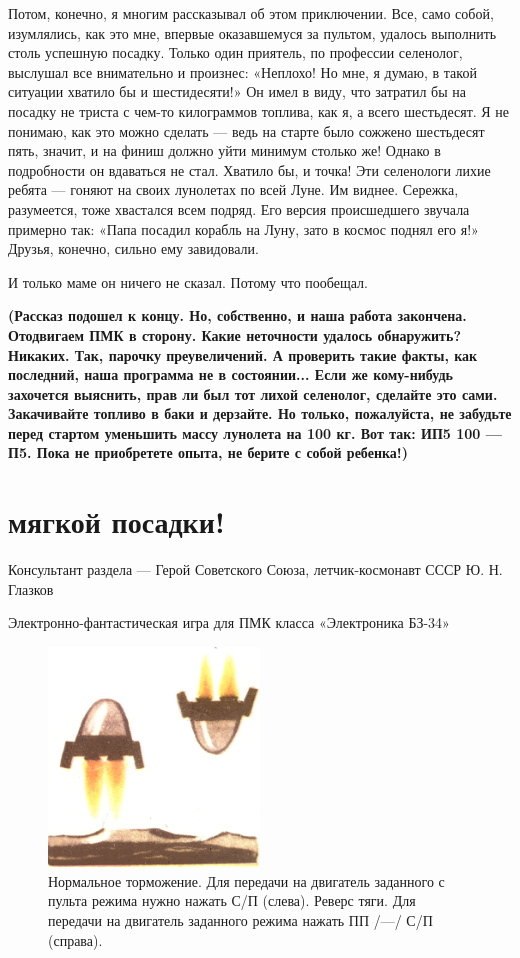 \documentclass[11pt,a4paper,oneside]{article}
\begin{document}
Потом, конечно, я многим рассказывал об этом приключении. Все, само собой, изумлялись, как это мне, впервые оказавшемуся за пультом, удалось выполнить столь успешную посадку. Только один приятель, по профессии селенолог, выслушал все внимательно и произнес: «Неплохо! Но мне, я думаю, в такой ситуации хватило бы и шестидесяти!» Он имел в виду, что затратил бы на посадку не триста с чем-то килограммов топлива, как я, а всего шестьдесят. Я не понимаю, как это можно сделать — ведь на старте было сожжено шестьдесят пять, значит, и на финиш должно уйти минимум столько же! Однако в подробности он вдаваться не стал. Хватило бы, и точка! Эти селенологи лихие ребята — гоняют на своих лунолетах по всей Луне. Им виднее.
Сережка, разумеется, тоже хвастался всем подряд. Его версия происшедшего звучала примерно так: «Папа посадил корабль на Луну, зато в космос поднял его я!» Друзья, конечно, сильно ему завидовали.

И только маме он ничего не сказал. Потому что пообещал.

\textbf{
(Рассказ подошел к концу. Но, собственно, и наша работа закончена. Отодвигаем ПМК в сторону. Какие неточности удалось обнаружить? Никаких. Так, парочку преувеличений. А проверить такие факты, как последний, наша программа не в состоянии...
Если же кому-нибудь захочется выяснить, прав ли был тот лихой селенолог, сделайте это сами. Закачивайте топливо в баки и дерзайте. Но только, пожалуйста, не забудьте перед стартом уменьшить массу лунолета на 100 кг. Вот так: ИП5 100 — П5. Пока не приобретете опыта, не берите с собой ребенка!)}

\section{мягкой посадки!}
Консультант раздела — Герой Советского Союза, летчик-космонавт СССР Ю. Н. Глазков

Электронно-фантастическая игра для ПМК класса «Электроника БЗ-34»

\begin{figure}[H]
\includegraphics[width=0.5\textwidth]{lunolet1_orientation}
\caption{Нормальное торможение. Для передачи на двигатель заданного с пульта режима нужно нажать С/П (слева). Реверс тяги. Для передачи на двигатель заданного режима нажать ПП /—/ С/П (справа).}
\end{figure}
\end{document}
